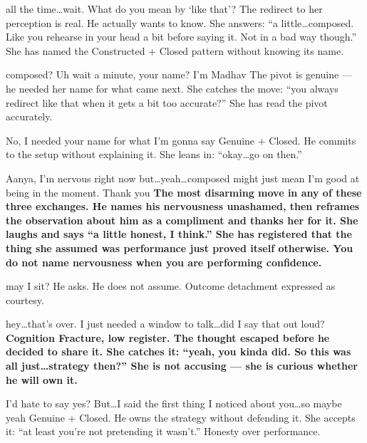 {all the time\ldots wait. What do you mean by `like that'?}
{The redirect to her perception is real. He actually wants to know. She answers: ``a little\ldots composed. Like you rehearse in your head a bit before saying it. Not in a bad way though.'' She has named the Constructed + Closed pattern without knowing its name.}

\thinrule

{composed? Uh wait a minute, your name? I'm Madhav}
{The pivot is genuine --- he needed her name for what came next. She catches the move: ``you always redirect like that when it gets a bit too accurate?'' She has read the pivot accurately.}

{No, I needed your name for what I'm gonna say}
{Genuine + Closed. He commits to the setup without explaining it. She leans in: ``okay\ldots go on then.''}

{Aanya, I'm nervous right now but\ldots yeah\ldots composed might just mean I'm good at being in the moment. Thank you}
{\textbf{The most disarming move in any of these three exchanges. He names his nervousness unashamed, then reframes the observation about him as a compliment and thanks her for it. She laughs and says ``a little honest, I think.'' She has registered that the thing she assumed was performance just proved itself otherwise. You do not name nervousness when you are performing confidence.}}

\thinrule

{may I sit?}
{He asks. He does not assume. Outcome detachment expressed as courtesy.}

{hey\ldots that's over. I just needed a window to talk\ldots did I say that out loud?}
{\textbf{Cognition Fracture, low register. The thought escaped before he decided to share it. She catches it: ``yeah, you kinda did. So this was all just\ldots strategy then?'' She is not accusing --- she is curious whether he will own it.}}

{I'd hate to say yes? But\ldots I said the first thing I noticed about you\ldots so maybe yeah}
{Genuine + Closed. He owns the strategy without defending it. She accepts it: ``at least you're not pretending it wasn't.'' Honesty over performance.}

\thinrule

